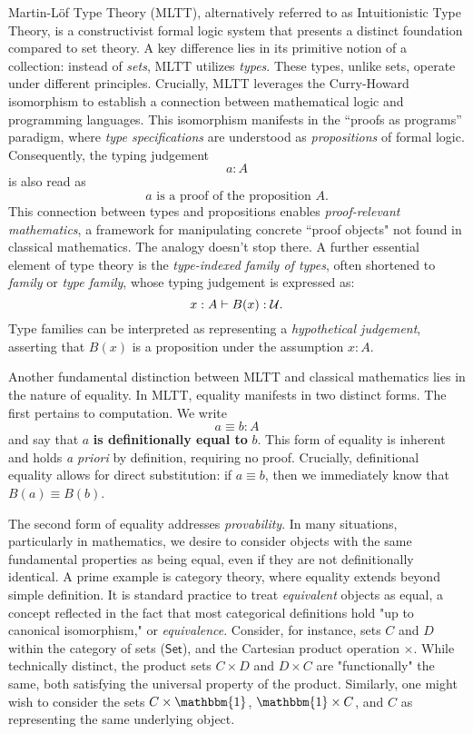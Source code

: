 \documentclass[main.tex]{subfiles}
\begin{document}
Martin-Löf Type Theory (MLTT), alternatively referred to as Intuitionistic Type Theory, is a constructivist formal logic system that presents a distinct foundation compared to set theory. A key difference lies in its primitive notion of a collection: instead of \textit{sets}, MLTT utilizes \textit{types}. These types, unlike sets, operate under different principles. Crucially, MLTT leverages the Curry-Howard isomorphism to establish a connection between mathematical logic and programming languages. This isomorphism manifests in the ``proofs as programs'' paradigm, where \textit{type specifications} are understood as \textit{propositions} of formal logic. Consequently, the typing judgement
\[ a : A \]
is also read as
\[
a \text{ is a proof of the proposition } A.
\]
This connection between types and propositions enables \textit{proof-relevant mathematics}, a framework for manipulating concrete ``proof objects" not found in classical mathematics. The analogy doesn't stop there. A further essential element of type theory is the \textit{type-indexed family of types}, often shortened to \textit{family} or \textit{type family}, whose typing judgement is expressed as:
\[
x : A \vdash B (x) : \mathcal{U}.
\]
Type families can be interpreted as representing a \textit{hypothetical judgement}, asserting that $B(x)$ is a proposition under the assumption $x:A$.

Another fundamental distinction between MLTT and classical mathematics lies in the nature of equality. In MLTT, equality manifests in two distinct forms. The first pertains to computation. We write \[ a \equiv b : A\] and say that $a$ \textbf{is definitionally equal to} $b$. This form of equality is inherent and holds \textit{a priori} by definition, requiring no proof. Crucially, definitional equality allows for direct substitution: if $a \equiv b$, then we immediately know that $B(a) \equiv B(b)$.

The second form of equality addresses \textit{provability}. In many situations, particularly in mathematics, we desire to consider objects with the same fundamental properties as being equal, even if they are not definitionally identical. A prime example is category theory, where equality extends beyond simple definition. It is standard practice to treat \textit{equivalent} objects as equal, a concept reflected in the fact that most categorical definitions hold "up to canonical isomorphism," or \textit{equivalence}. Consider, for instance, sets $C$ and $D$ within the category of sets ($\mathsf{Set}$), and the Cartesian product operation $\times$. While technically distinct, the product sets $C \times D$ and $D \times C$ are "functionally" the same, both satisfying the universal property of the product. Similarly, one might wish to consider the sets $C \times \mathbbm{1}$, $\mathbbm{1} \times C$, and $C$ as representing the same underlying object.
\end{document}
